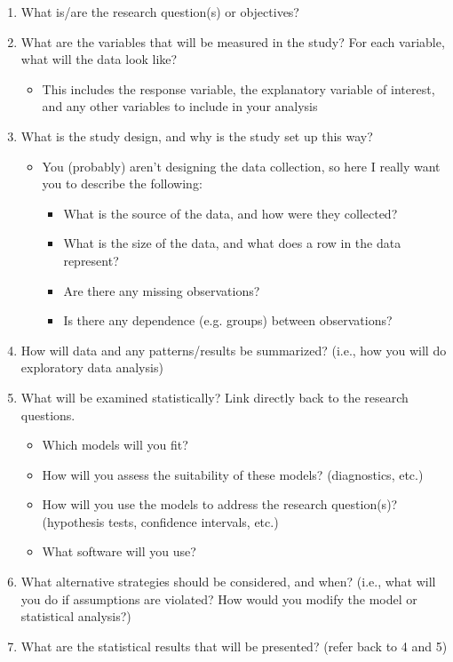 \documentclass[11pt]{article}
\begin{document}
\begin{enumerate}
\item What is/are the research question(s) or objectives?

\item What are the variables that will be measured in the study? For each variable, what will the data look like?
\begin{itemize}
\item This includes the response variable, the explanatory variable of interest, and any other variables to include in your analysis
\end{itemize}

\item What is the study design, and why is the study set up this way?
\begin{itemize}
\item You (probably) aren't designing the data collection, so here I really want you to describe the following:

\begin{itemize}
\item What is the source of the data, and how were they collected?
\item What is the size of the data, and what does a row in the data represent?
\item Are there any missing observations?
\item Is there any dependence (e.g. groups) between observations?
\end{itemize}
\end{itemize}

\item How will data and any patterns/results be summarized? (i.e., how you will do exploratory data analysis)

\item What will be examined statistically? Link directly back to the research questions.

\begin{itemize}
\item Which models will you fit?
\item How will you assess the suitability of these models? (diagnostics, etc.)
\item How will you use the models to address the research question(s)? (hypothesis tests, confidence intervals, etc.)
\item What software will you use?
\end{itemize}

\item What alternative strategies should be considered, and when? (i.e., what will you do if assumptions are violated? How would you modify the model or statistical analysis?)

\item What are the statistical results that will be presented? (refer back to 4 and 5)

\end{enumerate}
\end{document}
